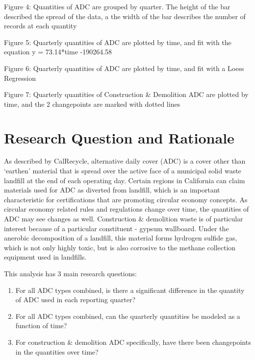 \documentclass[12pt,]{article}
\begin{document}
Figure 4: Quantities of ADC are grouped by quarter. The height of the
bar described the spread of the data, a the width of the bar describes
the number of records at each quantity

Figure 5: Quarterly quantities of ADC are plotted by time, and fit with
the equation y = 73.14*time -190264.58

Figure 6: Quarterly quantities of ADC are plotted by time, and fit with
a Loess Regression

Figure 7: Quarterly quantities of Construction \& Demolition ADC are
plotted by time, and the 2 changepoints are marked with dotted lines

\newpage

\section{Research Question and
Rationale}\label{research-question-and-rationale}

As described by CalRecycle, alternative daily cover (ADC) is a cover
other than `earthen' material that is spread over the active face of a
municipal solid waste landfill at the end of each operating day. Certain
regions in California can claim materials used for ADC as diverted from
landfill, which is an important characteristic for certifications that
are promoting circular economy concepts. As circular economy related
rules and regulations change over time, the quantities of ADC may see
changes as well. Construction \& demolition waste is of particular
interest because of a particular constituent - gypsum wallboard. Under
the anerobic decomposition of a landfill, this material forms hydrogen
sulfide gas, which is not only highly toxic, but is also corrosive to
the methane collection equipment used in landfills.

This analysis has 3 main research questions:

\begin{enumerate}
\def\labelenumi{\arabic{enumi})}
\item
  For all ADC types combined, is there a significant difference in the
  quantity of ADC used in each reporting quarter?
\item
  For all ADC types combined, can the quarterly quantities be modeled as
  a function of time?
\item
  For construction \& demolition ADC specifically, have there been
  changepoints in the quantities over time?
\end{enumerate}
\end{document}
